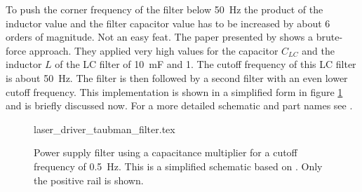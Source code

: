 To push the corner frequency of the filter below \qty{50}{\Hz} the product of the inductor value and the filter capacitor value has to be increased by about \num{6} orders of magnitude. Not an easy feat. The paper presented by \citeauthor{laser_driver_qcl_taubman} \cite{laser_driver_qcl_taubman} shows a brute-force approach. They applied very high values for the capacitor $C_{LC}$ and the inductor $L$ of the LC filter of \qty{10}{\milli\farad} and \qty{1}{\mH}. The cutoff frequency of this LC filter is about \qty{50}{\Hz}. The filter is then followed by a second filter with an even lower cutoff frequency. This implementation is shown in a simplified form in figure \ref{fig:laser_driver_taubman_filter} and is briefly discussed now. For a more detailed schematic and part names see \cite{laser_driver_qcl_taubman}.
\begin{figure}[ht]
    \centering
        {laser_driver_taubman_filter.tex}
    \caption{Power supply filter using a capacitance multiplier for a cutoff frequency of \qty{0.5}{\Hz}. This is a simplified schematic based on \cite{laser_driver_qcl_taubman}. Only the positive rail is shown.}
    \label{fig:laser_driver_taubman_filter}
\end{figure}


